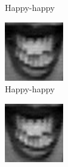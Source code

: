 \begin{figure}
\begin{subfigure}[b]{0.15\textwidth}
		\caption{Happy-happy}
		\label{fig:timeseriesHappy:k}
	\end{subfigure}
	\begin{subfigure}[b]{0.15\textwidth}
		\includegraphics[width=\textwidth]{./img/timeseriesHappy/S026_006_00000012.png}
		\caption{Happy-happy}
		\label{fig:timeseriesHappy:l}
	\end{subfigure}
	\begin{subfigure}[b]{0.15\textwidth}
		\includegraphics[width=\textwidth]{./img/timeseriesHappy/S026_006_00000013.png}

\end{subfigure}
\end{figure}
